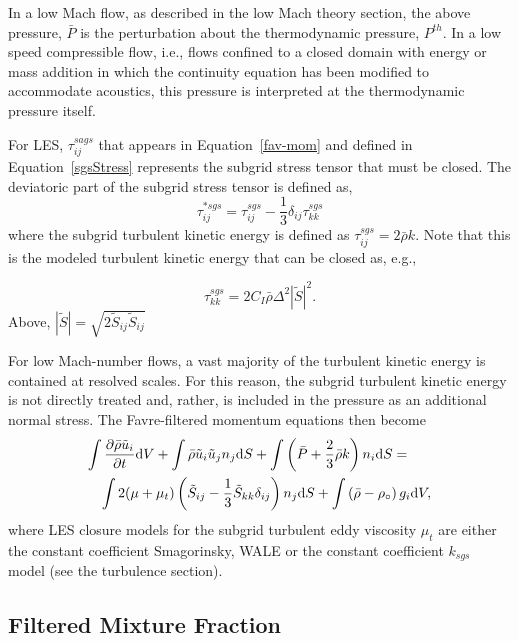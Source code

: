 In a low Mach flow, as described in the low Mach theory section, 
the above pressure, $\bar P$ is the perturbation about the thermodynamic
pressure, $P^{th}$. In a low speed compressible flow, i.e., flows confined to a closed
domain with energy or mass addition in which the continuity equation
has been modified to accommodate acoustics, this pressure is interpreted at the
thermodynamic pressure itself.

For LES, $\tau^{sags}_{ij}$ that appears in Equation~\ref{fav-mom} and defined in 
Equation~\ref{sgsStress} represents the subgrid stress tensor that must be closed.  The deviatoric part of the subgrid stress tensor is defined as,
%
\begin{equation}
\tau^{*sgs}_{ij} = \tau^{sgs}_{ij} - \frac{1}{3} \delta_{ij} \tau^{sgs}_{kk}
\end{equation}
%
where the subgrid turbulent kinetic energy is defined as $\tau^{sgs}_{ij} = 2 \bar \rho k$.
Note that this is the modeled turbulent kinetic energy that can be closed as, e.g.,

\begin{equation}
\tau^{sgs}_{kk} = 2 C_I \bar \rho \Delta^2 | \tilde S | ^2.
\end{equation}
%
Above, $ | \tilde S | = \sqrt {2 \tilde S_{ij} \tilde S_{ij}}$

For low Mach-number flows, a vast majority of the turbulent kinetic energy
is contained at resolved scales. For this reason, the subgrid turbulent kinetic energy is not 
directly treated and, rather, is included in the pressure as an
additional normal stress.  The Favre-filtered momentum equations then become
%
\begin{eqnarray}
\lefteqn{ \int {{\partial \bar{\rho} \tilde{u}_i} \over {\partial t}}
     {\rm d}V + \int \bar{\rho} \tilde{u}_i \tilde{u}_j n_j {\rm d}S 
   + \int \left( \bar{P} + \frac{2}{3} \bar{\rho} k \right) 
     n_i {\rm d}S = } \nonumber \\
   && \int 2 (\mu + \mu_t) \left( \tilde{S}_{ij} - \frac{1}{3}
      \tilde{S}_{kk} \delta_{ij} \right) n_j {\rm d}S
    + \int \left(\bar{\rho} - \rho_{\circ} \right) g_i {\rm d}V,
\label{mod-mom-les}
\end{eqnarray}
%
where LES closure models for the subgrid turbulent eddy viscosity
$\mu_t$ are either the constant coefficient Smagorinsky, WALE or the constant 
coefficient $k_{sgs}$ model (see the turbulence section).

\subsection{Filtered Mixture Fraction} \label{sec:filtered_Z}

